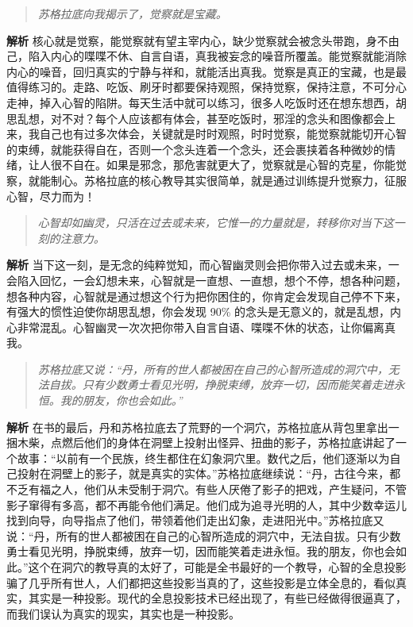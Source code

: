 \begin{quote}\it
    苏格拉底向我揭示了，觉察就是宝藏。
\end{quote}

\textbf{解析} 核心就是觉察，能觉察就有望主宰内心，缺少觉察就会被念头带跑，身不由己，陷入内心的喋喋不休、自言自语，真我被妄念的噪音所覆盖。能觉察就能消除内心的噪音，回归真实的宁静与祥和，就能活出真我。觉察是真正的宝藏，也是最值得练习的。走路、吃饭、刷牙时都要保持观照，保持觉察，保持注意，不可分心走神，掉入心智的陷阱。每天生活中就可以练习，很多人吃饭时还在想东想西，胡思乱想，对不对？每个人应该都有体会，甚至吃饭时，邪淫的念头和图像都会上来，我自己也有过多次体会，关键就是时时观照，时时觉察，能觉察就能切开心智的束缚，就能获得自在，否则一个念头连着一个念头，还会裹挟着各种微妙的情绪，让人很不自在。如果是邪念，那危害就更大了，觉察就是心智的克星，你能觉察，就能制心。苏格拉底的核心教导其实很简单，就是通过训练提升觉察力，征服心智，尽力而为！

\begin{quote}\it
    心智却如幽灵，只活在过去或未来，它惟一的力量就是，转移你对当下这一刻的注意力。
\end{quote}

\textbf{解析} 当下这一刻，是无念的纯粹觉知，而心智幽灵则会把你带入过去或未来，一会陷入回忆，一会幻想未来，心智就是一直想、一直想，想个不停，想各种问题，想各种内容，心智就是通过想这个行为把你困住的，你肯定会发现自己停不下来，有强大的惯性迫使你胡思乱想，你会发现 90\% 的念头是无意义的，就是乱想，内心非常混乱。心智幽灵一次次把你带入自言自语、喋喋不休的状态，让你偏离真我。

\begin{quote}\it
    苏格拉底又说：“丹，所有的世人都被困在自己的心智所造成的洞穴中，无法自拔。只有少数勇士看见光明，挣脱束缚，放弃一切，因而能笑着走进永恒。我的朋友，你也会如此。”
\end{quote}

\textbf{解析} 在书的最后，丹和苏格拉底去了荒野的一个洞穴，苏格拉底从背包里拿出一捆木柴，点燃后他们的身体在洞壁上投射出怪异、扭曲的影子，苏格拉底讲起了一个故事：“以前有一个民族，终生都住在幻象洞穴里。数代之后，他们逐渐以为自己投射在洞壁上的影子，就是真实的实体。”苏格拉底继续说：“丹，古往今来，都不乏有福之人，他们从未受制于洞穴。有些人厌倦了影子的把戏，产生疑问，不管影子窜得有多高，都不再能令他们满足。他们成为追寻光明的人，其中少数幸运儿找到向导，向导指点了他们，带领着他们走出幻象，走进阳光中。”苏格拉底又说：“丹，所有的世人都被困在自己的心智所造成的洞穴中，无法自拔。只有少数勇士看见光明，挣脱束缚，放弃一切，因而能笑着走进永恒。我的朋友，你也会如此。”这个在洞穴的教导真的太好了，可能是全书最好的一个教导，心智的全息投影骗了几乎所有世人，人们都把这些投影当真的了，这些投影是立体全息的，看似真实，其实是一种投影。现代的全息投影技术已经出现了，有些已经做得很逼真了，而我们误认为真实的现实，其实也是一种投影。


